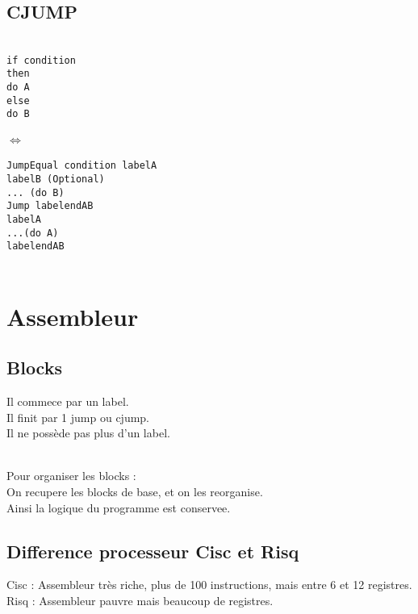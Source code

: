 \documentclass[a4paper,11pt]{article}
\begin{document}
\subsection{CJUMP}
\textemdash \textemdash \textemdash\textemdash \textemdash \textemdash \\
\texttt{if condition\\ then\\ do A\\ else\\ do B}\\
\textemdash \textemdash \textemdash\textemdash \textemdash \textemdash \\
$\Longleftrightarrow $\\
\textemdash \textemdash \textemdash\textemdash \textemdash \textemdash \\
\texttt{JumpEqual condition labelA\\
labelB (Optional)\\
... (do B)\\
Jump labelendAB\\
labelA\\
...(do A)\\
labelendAB\\
}
\textemdash \textemdash \textemdash \textemdash \textemdash \textemdash \\

\section{Assembleur}
\subsection{Blocks}
Il commece par un label.\\
Il finit par 1 jump ou cjump.\\
Il ne possède pas plus d'un label.\\

\

Pour organiser les blocks :\\
On recupere les blocks de base, et on les reorganise.\\
Ainsi la logique du programme est conservee.\\

\subsection{Difference processeur Cisc et Risq }
Cisc : Assembleur très riche, plus de 100 instructions, mais entre 6 et 12 registres.\\
Risq : Assembleur pauvre mais beaucoup de registres.\\
\end{document}
